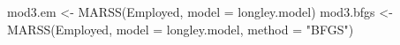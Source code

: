\begin{Schunk}
\begin{Sinput}
 mod3.em <- MARSS(Employed, model = longley.model)
 mod3.bfgs <- MARSS(Employed, model = longley.model, method = "BFGS")
\end{Sinput}
\end{Schunk}
